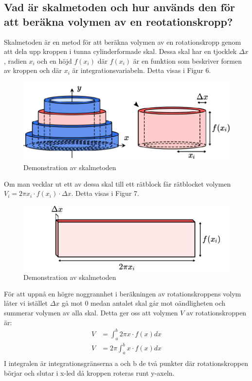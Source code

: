 \documentclass[12pt]{article}
\begin{document}
\subsection*{Vad är skalmetoden och hur används den för att beräkna volymen av en reotationskropp?}
Skalmetoden är en metod för att beräkna volymen av en rotationskropp genom att dela upp kroppen i tunna cylinderformade skal. Dessa skal har en tjocklek $\Delta x$, radien $x_i$ och en höjd $f(x_i)$ där $f(x_i)$ är en funktion som beskriver formen av kroppen och där $x_i$ är integrationsvariabeln. Detta visas i Figur 6.
\begin{figure}[H]
    \centering
    \renewcommand{\thefigure}{6}
    \includegraphics[width=\textwidth]{figur6.png}
    \caption{Demonstration av skalmetoden}
\end{figure}
Om man vecklar ut ett av dessa skal till ett rätblock får rätblocket volymen $V_i=2\pi x_i\cdot f(x_i)\cdot \Delta x$. Detta visas i Figur 7.
\begin{figure}[H]
    \centering
    \renewcommand{\thefigure}{7}
    \includegraphics[width=\textwidth]{figur7.png}
    \caption{Demonstration av skalmetoden}
\end{figure}
\newpage
För att uppnå en högre noggrannhet i beräkningen av rotationskroppens volym låter vi istället $\Delta x$ gå mot 0 medan antalet skal går mot oändligheten och summerar volymen av alla skal. Detta ger oss att volymen $V$ av rotationskroppen är:
\begin{align*}
    V&=\int_{a}^{b}2\pi x\cdot f(x) dx\\
    V&=2\pi\int_{a}^{b}x\cdot f(x) dx\\
\end{align*}
I integralen är integrationsgränserna a och b de två punkter där rotationskroppen börjar och slutar i x-led då kroppen roteras runt y-axeln.\\
\end{document}
